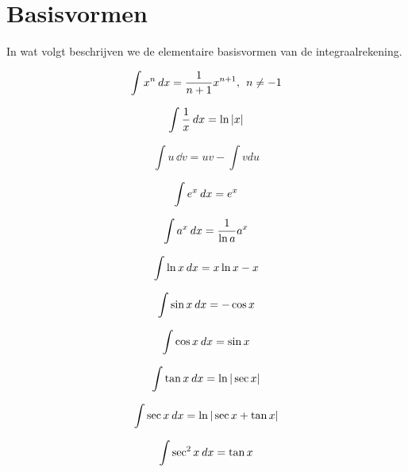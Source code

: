 \chapter{Basisvormen}

In wat volgt beschrijven we de elementaire basisvormen van de integraalrekening.
\newpage

\begin{multicols}{2}
	
	\begin{equation}
	\int x^n \hspace{2pt}dx = \frac{1}{n+1}x^{n+1}, \hspace{1ex} n\neq-1
	\end{equation}
	
	\begin{equation}
	\int \frac{1}{x}\hspace{2pt}dx = \ln |x|
	\end{equation}
	
	\begin{equation}
	\int u \hspace{2pt} \dd{v} = uv - \int v du
	\end{equation}
	
	
	
	\begin{equation}
	\int e^x \hspace{2pt}dx = e^x 
	\end{equation}
	
	\begin{equation}
	\int a^x \hspace{2pt}dx = \frac{1}{\ln a} a^x
	\end{equation}
	
	\begin{equation}
	\int \ln x \hspace{2pt}dx = x \ln x - x
	\end{equation}
	
	
	\begin{equation}
	\int \sin x \hspace{2pt}dx = -\cos x
	\end{equation}
	
	\begin{equation}
	\int \cos x \hspace{2pt}dx = \sin x
	\end{equation}
	
	\begin{equation}
	\int \tan x \hspace{2pt}dx = \ln |\sec x| 
	\end{equation}
	
	\begin{equation}
	\int \sec x \hspace{2pt}dx = \ln |\sec x + \tan x|
	\end{equation}
	
	\begin{equation}
	\int \sec^2 x \hspace{2pt}dx = \tan x
	\end{equation}
	

\end{multicols}
